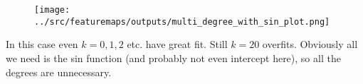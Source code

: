 %
%
\begin{answer}
\begin{figure}[H]
	\texttt{[image: ../src/featuremaps/outputs/multi\_degree\_with\_sin\_plot.png]}
\end{figure}

In this case even $k=0,1,2$ etc. have great fit. Still $k=20$ overfits. Obviously all we need is the sin function (and probably not even intercept here), so all the degrees are unnecessary.
\end{answer}
%